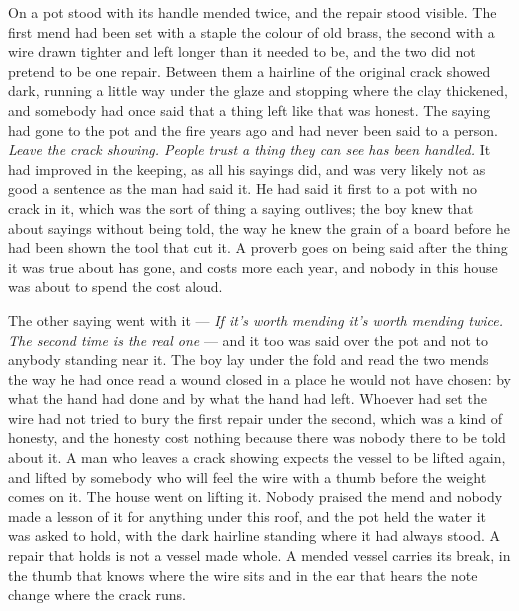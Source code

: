 On  a pot stood with its handle mended twice, and the repair stood visible. The first mend had been set with a staple the colour of old brass, the second with a wire drawn tighter and left longer than it needed to be, and the two did not pretend to be one repair. Between them a hairline of the original crack showed dark, running a little way under the glaze and stopping where the clay thickened, and somebody had once said that a thing left like that was honest. The saying had gone to the pot and the fire years ago and had never been said to a person. \emph{Leave the crack showing. People trust a thing they can see has been handled.} It had improved in the keeping, as all his sayings did, and was very likely not as good a sentence as the man had said it. He had said it first to a pot with no crack in it, which was the sort of thing a saying outlives; the boy knew that about sayings without being told, the way he knew the grain of a board before he had been shown the tool that cut it. A proverb goes on being said after the thing it was true about has gone, and costs more each year, and nobody in this house was about to spend the cost aloud.

The other saying went with it --- \emph{If it's worth mending it's worth mending twice. The second time is the real one} --- and it too was said over the pot and not to anybody standing near it. The boy lay under the fold and read the two mends the way he had once read a wound closed in a place he would not have chosen: by what the hand had done and by what the hand had left. Whoever had set the wire had not tried to bury the first repair under the second, which was a kind of honesty, and the honesty cost nothing because there was nobody there to be told about it. A man who leaves a crack showing expects the vessel to be lifted again, and lifted by somebody who will feel the wire with a thumb before the weight comes on it. The house went on lifting it. Nobody praised the mend and nobody made a lesson of it for anything under this roof, and the pot held the water it was asked to hold, with the dark hairline standing where it had always stood. A repair that holds is not a vessel made whole. A mended vessel carries its break, in the thumb that knows where the wire sits and in the ear that hears the note change where the crack runs.


